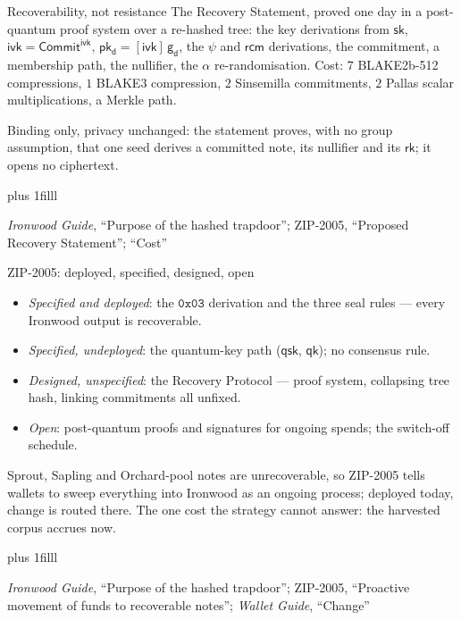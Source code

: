 \documentclass[aspectratio=169,11pt]{beamer}
\newcommand{\rksym}{\ensuremath{\mathsf{rk}}}
\newcommand{\gd}{\ensuremath{\mathsf{g_d}}}
\newcommand{\pkd}{\ensuremath{\mathsf{pk_d}}}
\newcommand{\ivk}{\ensuremath{\mathsf{ivk}}}
\newcommand{\rcm}{\ensuremath{\mathsf{rcm}}}
\newcommand{\CommitIvk}{\ensuremath{\mathsf{Commit}^{\mathsf{ivk}}}}
\newcommand{\src}[1]{\par\vskip0pt plus 1filll
  {\fontsize{6}{7.2}\selectfont\color{arbdim}\raggedright #1\par}}
\begin{document}
\begin{frame}{Recoverability, not resistance}
The Recovery Statement, proved one day in a post-quantum proof system
over a re-hashed tree: the key derivations from $\mathsf{sk}$, $\ivk =
\CommitIvk$, $\pkd = [\ivk]\,\gd$, the $\psi$ and \rcm{} derivations,
the commitment, a membership path, the nullifier, the $\alpha$
re-randomisation. Cost: $7$ BLAKE2b-512 compressions, $1$ BLAKE3
compression, $2$ Sinsemilla commitments, $2$ Pallas scalar
multiplications, a Merkle path.

\medskip
Binding only, privacy unchanged: the statement proves, with no group
assumption, that one seed derives a committed note, its nullifier and its
\rksym; it opens no ciphertext.
\src{\emph{Ironwood Guide}, ``Purpose of the hashed trapdoor'';
ZIP-2005, ``Proposed Recovery Statement''; ``Cost''}
\end{frame}

\begin{frame}{ZIP-2005: deployed, specified, designed, open}
\begin{itemize}
  \item \emph{Specified and deployed}: the $\mathtt{0x03}$ derivation and
    the three seal rules --- every Ironwood output is recoverable.
  \item \emph{Specified, undeployed}: the quantum-key path
    ($\mathsf{qsk}$, $\mathsf{qk}$); no consensus rule.
  \item \emph{Designed, unspecified}: the Recovery Protocol --- proof
    system, collapsing tree hash, linking commitments all unfixed.
  \item \emph{Open}: post-quantum proofs and signatures for ongoing
    spends; the switch-off schedule.
\end{itemize}
Sprout, Sapling and Orchard-pool notes are unrecoverable, so ZIP-2005
tells wallets to sweep everything into Ironwood as an ongoing process;
deployed today, change is routed there. The one cost the strategy cannot
answer: the harvested corpus accrues now.
\src{\emph{Ironwood Guide}, ``Purpose of the hashed trapdoor''; ZIP-2005,
``Proactive movement of funds to recoverable notes''; \emph{Wallet Guide},
``Change''}
\end{frame}
\end{document}
